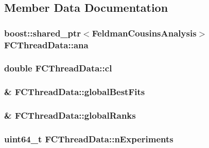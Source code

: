 \subsection{Member Data Documentation}
\hypertarget{structFCThreadData_aab12c7f409e8e59d773d931a4d0b8187}{
\subsubsection[{ana}]{\setlength{\rightskip}{0pt plus 5cm}boost\-::shared\-\_\-ptr$<${\bf Feldman\-Cousins\-Analysis}$>$ F\-C\-Thread\-Data\-::ana}}\label{structFCThreadData_aab12c7f409e8e59d773d931a4d0b8187}
\hypertarget{structFCThreadData_a11a41bb60670a5b8a13b3c9dd961d0d0}{
\subsubsection[{cl}]{\setlength{\rightskip}{0pt plus 5cm}double F\-C\-Thread\-Data\-::cl}}\label{structFCThreadData_a11a41bb60670a5b8a13b3c9dd961d0d0}
\hypertarget{structFCThreadData_a8a5d6203aab57c1c05f4d6a2fa549344}{
\subsubsection[{global\-Best\-Fits}]{\& F\-C\-Thread\-Data\-::global\-Best\-Fits}}\label{structFCThreadData_a8a5d6203aab57c1c05f4d6a2fa549344}
\hypertarget{structFCThreadData_afdceefad89e168d411041e126fa48a0c}{
\subsubsection[{global\-Ranks}]{\& F\-C\-Thread\-Data\-::global\-Ranks}}\label{structFCThreadData_afdceefad89e168d411041e126fa48a0c}
\hypertarget{structFCThreadData_a721d95b6dbaeae9dd9a1772794cbc2b2}{
\subsubsection[{n\-Experiments}]{\setlength{\rightskip}{0pt plus 5cm}uint64\-\_\-t F\-C\-Thread\-Data\-::n\-Experiments}}\label{structFCThreadData_a721d95b6dbaeae9dd9a1772794cbc2b2}
